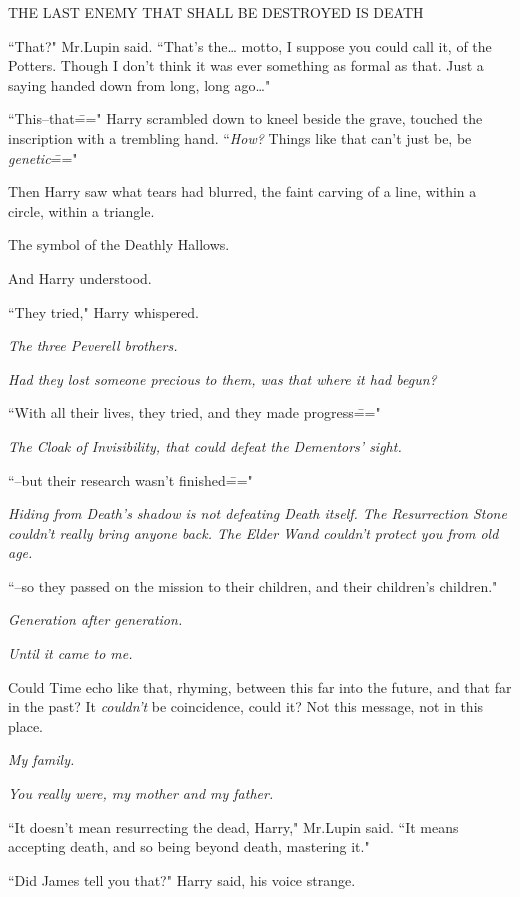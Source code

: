 \begin{center}
THE LAST ENEMY THAT SHALL BE DESTROYED IS DEATH
\end{center}

``That?" Mr.\?Lupin said. ``That's the{\ldots} motto, I suppose you could call it, of the Potters. Though I don't think it was ever something as formal as that. Just a saying handed down from long, long ago{\ldots}"

``This\---that\===" Harry scrambled down to kneel beside the grave, touched the inscription with a trembling hand. ``\emph{How?} Things like that can't just be, be \emph{genetic}\==="

Then Harry saw what tears had blurred, the faint carving of a line, within a circle, within a triangle.

The symbol of the Deathly Hallows.

And Harry understood.

``They tried," Harry whispered.

\emph{The three Peverell brothers.}

\emph{Had they lost someone precious to them, was that where it had begun?}

``With all their lives, they tried, and they made progress\==="

\emph{The Cloak of Invisibility, that could defeat the Dementors' sight.}

``\---but their research wasn't finished\==="

\emph{Hiding from Death's shadow is not defeating Death itself. The Resurrection Stone couldn't really bring anyone back. The Elder Wand couldn't protect you from old age.}

``\---so they passed on the mission to their children, and their children's children."

\emph{Generation after generation.}

\emph{Until it came to me.}

Could Time echo like that, rhyming, between this far into the future, and that far in the past? It \emph{couldn't} be coincidence, could it? Not this message, not in this place.

\emph{My family.}

\emph{You really were, my mother and my father.}

``It doesn't mean resurrecting the dead, Harry," Mr.\?Lupin said. ``It means accepting death, and so being beyond death, mastering it."

``Did James tell you that?" Harry said, his voice strange.

